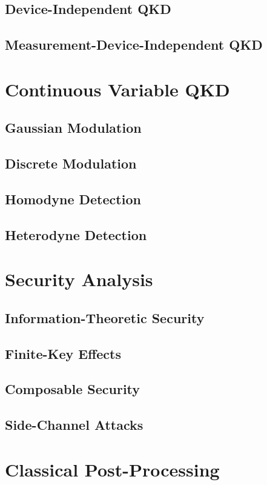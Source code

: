 \documentclass[12pt,a4paper]{book}
\begin{document}
\subsection{Device-Independent QKD}
\subsection{Measurement-Device-Independent QKD}

\section{Continuous Variable QKD}
\subsection{Gaussian Modulation}
\subsection{Discrete Modulation}
\subsection{Homodyne Detection}
\subsection{Heterodyne Detection}

\section{Security Analysis}
\subsection{Information-Theoretic Security}
\subsection{Finite-Key Effects}
\subsection{Composable Security}
\subsection{Side-Channel Attacks}

\section{Classical Post-Processing}
\end{document}
